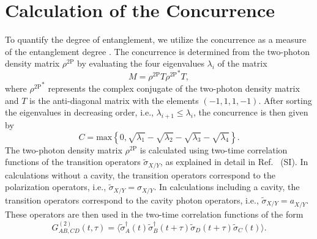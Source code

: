 \documentclass[%
 reprint,superscriptaddress,
 amsmath,amssymb,
 aps]{revtex4-2}
\begin{document}
\section{Calculation of the Concurrence}
To quantify the degree of entanglement, we utilize the concurrence as a measure of the entanglement degree \cite{wootters1998entanglement}.
The concurrence is determined from the two-photon density matrix $\rho^{\text{2P}}$ by evaluating the four eigenvalues $\lambda_i$ of the matrix
\begin{equation}
    M = \rho^{\text{2P}} T {\rho^{\text{2P}}}^* T ,
\end{equation}
where ${\rho^{\text{2P}}}^*$ represents the complex conjugate of the two-photon density matrix and $T$ is the anti-diagonal matrix with the elements $(-1,1,1,-1)$. After sorting the eigenvalues in decreasing order, i.e., $\lambda_{i+1}\le\lambda_i$, the concurrence is then given by \cite{james2001measurment,wootters1998entanglement}
\begin{equation}
    C = \text{max}\left\{0,\sqrt{\lambda_1}-\sqrt{\lambda_2}-\sqrt{\lambda_3}-\sqrt{\lambda_4}\right\}.
\end{equation}
The two-photon density matrix $\rho^{\text{2P}}$ is calculated using two-time correlation functions of the transition operators $\tilde{\sigma}_{X/Y}$, as explained in detail in Ref.~\cite{seidelmann2022two} (SI). In calculations without a cavity, the transition operators correspond to the polarization operators, i.e., $\tilde{\sigma}_{X/Y}=\sigma_{X/Y}$. In calculations including a cavity, the transition operators correspond to the cavity photon operators, i.e., $\tilde{\sigma}_{X/Y}=a^{\phantom{\dagger}}_{X/Y}$.  
These operators are then used in the two-time correlation functions of the form 
\begin{equation}
    G^{(2)}_{AB,CD}(t,\tau) = \langle \tilde{\sigma}_A^{\dagger}(t)\tilde{\sigma}_B^{\dagger}(t+\tau)\tilde{\sigma}_D(t+\tau)\tilde{\sigma}_C(t) \rangle.
\end{equation}
\end{document}

